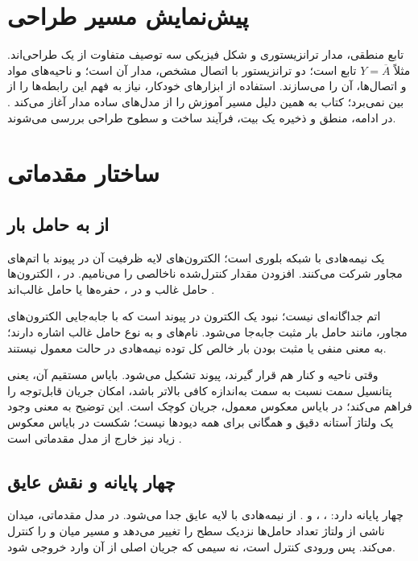 \section{پیش‌نمایش مسیر طراحی}
\label{sec:book-preview}
تابع منطقی، مدار ترانزیستوری و شکل فیزیکی سه توصیف متفاوت از یک طراحی‌اند.
مثلاً \(Y=\overline{A}\) تابع است؛ دو ترانزیستور با اتصال مشخص، مدار آن است؛
و ناحیه‌های مواد و اتصال‌ها،  آن را می‌سازند.
استفاده از ابزارهای خودکار، نیاز به فهم این رابطه‌ها را از بین نمی‌برد؛
کتاب به همین دلیل مسیر آموزش را از مدل‌های ساده مدار آغاز می‌کند
\cite[بخش ]{weste}.
در ادامه، منطق و ذخیره یک بیت، فرآیند ساخت و سطوح طراحی بررسی می‌شوند.

\section{ساختار مقدماتی }
\label{sec:ch1-mos}
\subsection{از  به حامل بار}
 یک نیمه‌هادی با شبکه بلوری است؛ الکترون‌های لایه ظرفیت آن
در پیوند با اتم‌های مجاور شرکت می‌کنند. افزودن مقدار کنترل‌شده ناخالصی
را  می‌نامیم. در ، الکترون‌ها حامل غالب و در
، حفره‌ها یا  حامل غالب‌اند
\cite[بخش ]{weste}\cite[اسلایدهای ۲ و ۳]{mos}.

 اتم جداگانه‌ای نیست؛ نبود یک الکترون در پیوند است که با جابه‌جایی
الکترون‌های مجاور، مانند حامل بار مثبت جابه‌جا می‌شود.
نام‌های  و  به نوع حامل غالب اشاره دارند؛
به معنی منفی یا مثبت بودن بار خالص کل توده نیمه‌هادی در حالت معمول نیستند.

وقتی ناحیه  و  کنار هم قرار گیرند، پیوند 
تشکیل می‌شود. بایاس مستقیم آن، یعنی پتانسیل سمت  نسبت به سمت 
به‌اندازه کافی بالاتر باشد، امکان جریان قابل‌توجه را فراهم می‌کند؛
در بایاس معکوس معمول، جریان کوچک است.
این توضیح به معنی وجود یک ولتاژ آستانه دقیق و همگانی برای همه دیودها نیست؛
شکست در بایاس معکوس زیاد نیز خارج از مدل مقدماتی است
\cite[صفحه چاپی ۷]{weste}.

\subsection{چهار پایانه و نقش عایق}
چهار پایانه دارد: ، ،  و .
 از نیمه‌هادی با لایه عایق جدا می‌شود.
در مدل مقدماتی، میدان ناشی از ولتاژ  تعداد حامل‌ها نزدیک سطح
را تغییر می‌دهد و مسیر میان  و  را کنترل می‌کند.
پس  ورودی کنترل است، نه سیمی که جریان اصلی از آن وارد خروجی شود.

